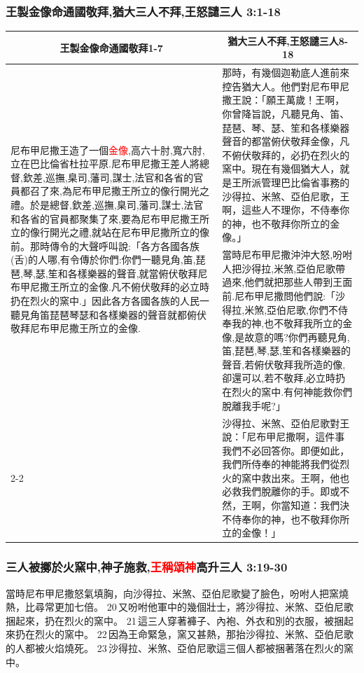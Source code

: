 \subsubsection{王製金像命通國敬拜,猶大三人不拜,王怒譴三人 3:1-18}
\begin{table}[H]
\centering
\begin{tabular}{p{6.9cm}|p{}}\hline\hline
\multicolumn{1}{c|}{王製金像命通國敬拜1-7}&\multicolumn{1}{c}{猶大三人不拜,王怒譴三人8-18}\\\hline
\multirow{2}{7.2cm}{尼布甲尼撒王造了一個\textcolor{red}{金像},高六十肘,寬六肘,立在巴比倫省杜拉平原.尼布甲尼撒王差人將總督,欽差,巡撫,臬司,藩司,謀士,法官和各省的官員都召了來,為尼布甲尼撒王所立的像行開光之禮。於是總督,欽差,巡撫,臬司,藩司,謀士,法官和各省的官員都聚集了來,要為尼布甲尼撒王所立的像行開光之禮,就站在尼布甲尼撒所立的像前。那時傳令的大聲呼叫說:「各方各國各族(舌)的人哪,有令傳於你們:你們一聽見角,笛,琵琶,琴,瑟,笙和各樣樂器的聲音,就當俯伏敬拜尼布甲尼撒王所立的金像.凡不俯伏敬拜的必立時扔在烈火的窯中.」因此各方各國各族的人民一聽見角笛琵琶琴瑟和各樣樂器的聲音就都俯伏敬拜尼布甲尼撒王所立的金像.}
&那時，有幾個迦勒底人進前來控告猶大人。他們對尼布甲尼撒王說：「願王萬歲！王啊，你曾降旨說，凡聽見角、笛、琵琶、琴、瑟、笙和各樣樂器聲音的都當俯伏敬拜金像，凡不俯伏敬拜的，必扔在烈火的窯中。現在有幾個猶大人，就是王所派管理巴比倫省事務的沙得拉、米煞、亞伯尼歌，王啊，這些人不理你，不侍奉你的神，也不敬拜你所立的金像。」\\\cline{2-2}
&當時尼布甲尼撒沖沖大怒,吩咐人把沙得拉,米煞,亞伯尼歌帶過來,他們就把那些人帶到王面前.尼布甲尼撒問他們說:「沙得拉,米煞,亞伯尼歌,你們不侍奉我的神,也不敬拜我所立的金像,是故意的嗎?你們再聽見角,笛,琵琶,琴,瑟,笙和各樣樂器的聲音,若俯伏敬拜我所造的像,卻還可以,若不敬拜,必立時扔在烈火的窯中.有何神能救你們脫離我手呢?」\\\cline{2-2}
&沙得拉、米煞、亞伯尼歌對王說：「尼布甲尼撒啊，這件事我們不必回答你。即便如此，我們所侍奉的神能將我們從烈火的窯中救出來。王啊，他也必救我們脫離你的手。即或不然，王啊，你當知道：我們決不侍奉你的神，也不敬拜你所立的金像！」\\\hline
\end{tabular}
\end{table}


\subsubsection{三人被擲於火窯中,神子施救,\textcolor{red}{王稱頌神}高升三人 3:19-30}
當時尼布甲尼撒怒氣填胸，向沙得拉、米煞、亞伯尼歌變了臉色，吩咐人把窯燒熱，比尋常更加七倍。 20 又吩咐他軍中的幾個壯士，將沙得拉、米煞、亞伯尼歌捆起來，扔在烈火的窯中。 21 這三人穿著褲子、內袍、外衣和別的衣服，被捆起來扔在烈火的窯中。 22 因為王命緊急，窯又甚熱，那抬沙得拉、米煞、亞伯尼歌的人都被火焰燒死。 23 沙得拉、米煞、亞伯尼歌這三個人都被捆著落在烈火的窯中。


